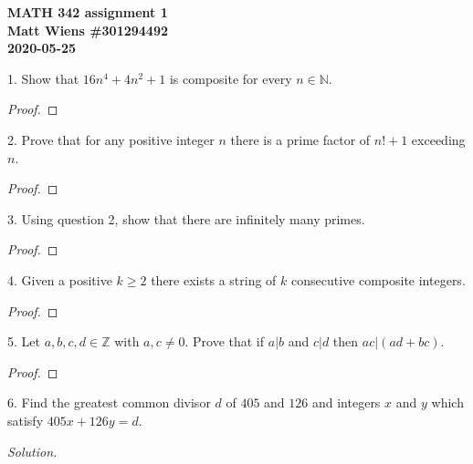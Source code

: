 \documentclass{article}
\newcommand{\N}{\mathbb{N}}
\newcommand{\Z}{\mathbb{Z}}
\begin{document}
\textbf{MATH 342 assignment 1} \\
\textbf{Matt Wiens \#301294492} \\
\textbf{2020-05-25}

1. Show that $16 n^4 + 4 n^2 + 1$ is composite for every $n \in \N$.

\begin{proof}
\end{proof}

\newpage

2. Prove that for any positive integer $n$ there is a prime factor of
   $n! + 1$ exceeding $n$.

\begin{proof}
\end{proof}

\newpage

3. Using question 2, show that there are infinitely many primes.

\begin{proof}
\end{proof}

\newpage

4. Given a positive $k \geq 2$ there exists a string of $k$ consecutive
   composite integers.

\begin{proof}
\end{proof}

\newpage

5. Let $a, b, c, d \in \Z$ with $a, c \neq 0$. Prove that if $a|b$ and
   $c|d$ then $ac|(ad + bc)$.

\begin{proof}
\end{proof}

\newpage

6. Find the greatest common divisor $d$ of $405$ and $126$ and integers
   $x$ and $y$ which satisfy $405x + 126y = d$.

\textit{Solution.}
\end{document}

